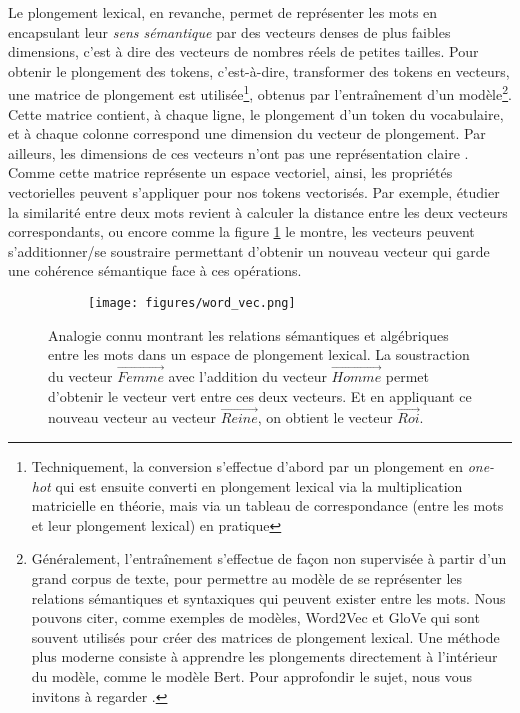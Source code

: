 \documentclass[12pt, twoside]{report}
\begin{document}
Le plongement lexical, en revanche, permet de représenter les mots en encapsulant leur \textit{sens sémantique} par des vecteurs denses de plus faibles dimensions, c'est à dire des vecteurs de nombres réels de petites tailles. Pour obtenir le plongement des tokens, c'est-à-dire, transformer des tokens en vecteurs, une matrice de plongement est utilisée\footnote{Techniquement, la conversion s'effectue d'abord par un plongement en \textit{one-hot} qui est ensuite converti en plongement lexical via la multiplication matricielle en théorie, mais via un tableau de correspondance (entre les mots et leur plongement lexical) en pratique}, obtenus par l'entraînement d'un modèle\footnote{Généralement, l'entraînement s'effectue de façon non supervisée à partir d'un grand corpus de texte, pour permettre au modèle de se représenter les relations sémantiques et syntaxiques qui peuvent exister entre les mots. Nous pouvons citer, comme exemples de modèles, Word2Vec et GloVe qui sont souvent utilisés pour créer des matrices de plongement lexical. Une méthode plus moderne consiste à apprendre les plongements directement à l'intérieur du modèle, comme le modèle Bert. Pour approfondir le sujet, nous vous invitons à regarder \autocite[chap.~6, 7, 11]{jurafsky}.}. Cette matrice contient, à chaque ligne, le plongement d'un \gls{token} du vocabulaire, et à chaque colonne correspond une dimension du vecteur de plongement. Par ailleurs, les dimensions de ces vecteurs n'ont pas une représentation claire \autocite[chap.~6]{jurafsky}. Comme cette matrice représente un espace vectoriel, ainsi, les propriétés vectorielles peuvent s'appliquer pour nos tokens vectorisés. Par exemple, étudier la similarité entre deux mots revient à calculer la distance entre les deux vecteurs correspondants, ou encore comme la figure \ref{fig:wordvec} le montre, les vecteurs peuvent s'additionner/se soustraire permettant d'obtenir un nouveau vecteur qui garde une cohérence sémantique face à ces opérations. \autocite{rumel} \autocite{lund}

\begin{figure}[!h]
    \centering
    \begin{subfigure}[b]{0.6\textwidth}
        \texttt{[image: figures/word\_vec.png]}
    \end{subfigure}
    \caption{Analogie connu montrant les relations sémantiques et algébriques entre les mots dans un espace de plongement lexical. La soustraction du vecteur $\overrightarrow{Femme}$ avec l'addition du vecteur $\overrightarrow{Homme}$ permet d'obtenir le vecteur vert entre ces deux vecteurs. Et en appliquant ce nouveau vecteur au vecteur $\overrightarrow{Reine}$, on obtient le vecteur $\overrightarrow{Roi}$.}
    \label{fig:wordvec}
\end{figure}
\end{document}
